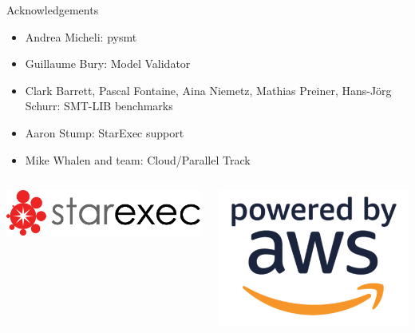 \documentclass[table]{beamer}
\def\emph#1{\textcolor{MYblue}{#1}}
\begin{document}
\begin{frame}{Acknowledgements}
  \begin{itemize}
    \item \emph{Andrea Micheli}: pysmt
    \item \emph{Guillaume Bury}: Model Validator
    \item \emph{Clark Barrett, Pascal Fontaine, Aina Niemetz, Mathias Preiner, Hans-Jörg Schurr}: SMT-LIB benchmarks
    \item \emph{Aaron Stump}: StarExec support
    \item \emph{Mike Whalen and team}: Cloud/Parallel Track
  \end{itemize}
  \bigskip

  \begin{columns}
    \begin{column}{.3\textwidth}
      \includegraphics[width=\textwidth]{starlogo}
    \end{column}
    \begin{column}{.17\textwidth}
      \includegraphics[width=\textwidth]{powered-by-aws}
    \end{column}
  \end{columns}
\end{frame}
\end{document}
